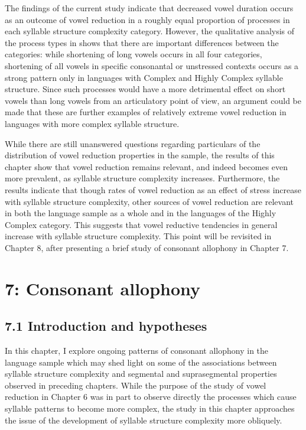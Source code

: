   The findings of the current study indicate that decreased vowel duration occurs as an outcome of vowel reduction in a roughly equal proportion of processes in each syllable structure complexity category. However, the qualitative analysis of the process types in  shows that there are important differences between the categories: while shortening of long vowels occurs in all four categories, shortening of all vowels in specific consonantal or unstressed contexts occurs as a strong pattern only in languages with Complex and Highly Complex syllable structure. Since such processes would have a more detrimental effect on short vowels than long vowels from an articulatory point of view, an argument could be made that these are further examples of relatively extreme vowel reduction in languages with more complex syllable structure.

  While there are still unanswered questions regarding particulars of the distribution of vowel reduction properties in the sample, the results of this chapter show that vowel reduction remains relevant, and indeed becomes even more prevalent, as syllable structure complexity increases. Furthermore, the results indicate that though rates of vowel reduction as an effect of stress increase with syllable structure complexity, other sources of vowel reduction are relevant in both the language sample as a whole and in the languages of the Highly Complex category. This suggests that vowel reductive tendencies in general increase with syllable structure complexity. This point will be revisited in Chapter 8, after presenting a brief study of consonant allophony in Chapter 7.

\chapter{7: Consonant allophony}
\section{7.1 Introduction and hypotheses}

  In this chapter, I explore ongoing patterns of consonant allophony in the language sample which may shed light on some of the associations between syllable structure complexity and segmental and suprasegmental properties observed in preceding chapters. While the purpose of the study of vowel reduction in Chapter 6 was in part to observe directly the processes which cause syllable patterns to become more complex, the study in this chapter approaches the issue of the development of syllable structure complexity more obliquely. 

